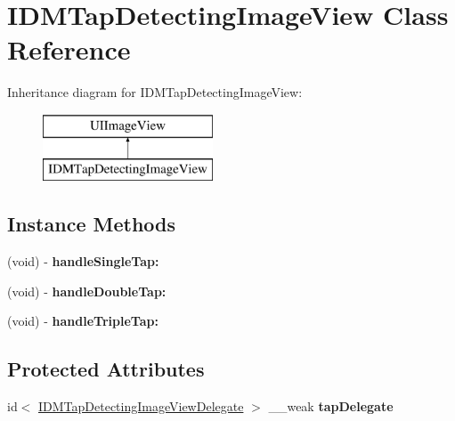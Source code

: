 \hypertarget{interface_i_d_m_tap_detecting_image_view}{}\section{I\+D\+M\+Tap\+Detecting\+Image\+View Class Reference}
\label{interface_i_d_m_tap_detecting_image_view}
Inheritance diagram for I\+D\+M\+Tap\+Detecting\+Image\+View\+:\begin{figure}[H]
\begin{center}
\leavevmode
\includegraphics[height=2.000000cm]{interface_i_d_m_tap_detecting_image_view}
\end{center}
\end{figure}
\subsection*{Instance Methods}
\begin{DoxyCompactItemize}
\item 
\hypertarget{interface_i_d_m_tap_detecting_image_view_adac6d51b2640db50081f49e0937feff8}{}(void) -\/ {\bfseries handle\+Single\+Tap\+:}\label{interface_i_d_m_tap_detecting_image_view_adac6d51b2640db50081f49e0937feff8}

\item 
\hypertarget{interface_i_d_m_tap_detecting_image_view_a954bbce654b02a4028350499b0006f5d}{}(void) -\/ {\bfseries handle\+Double\+Tap\+:}\label{interface_i_d_m_tap_detecting_image_view_a954bbce654b02a4028350499b0006f5d}

\item 
\hypertarget{interface_i_d_m_tap_detecting_image_view_a403fef805a2af6d24cfcc1657c70ad48}{}(void) -\/ {\bfseries handle\+Triple\+Tap\+:}\label{interface_i_d_m_tap_detecting_image_view_a403fef805a2af6d24cfcc1657c70ad48}

\end{DoxyCompactItemize}
\subsection*{Protected Attributes}
\begin{DoxyCompactItemize}
\item 
\hypertarget{interface_i_d_m_tap_detecting_image_view_af2335106c2b0eb426abf6b951a583a84}{}id$<$ \hyperlink{protocol_i_d_m_tap_detecting_image_view_delegate-p}{I\+D\+M\+Tap\+Detecting\+Image\+View\+Delegate} $>$ \+\_\+\+\_\+weak {\bfseries tap\+Delegate}\label{interface_i_d_m_tap_detecting_image_view_af2335106c2b0eb426abf6b951a583a84}

\end{DoxyCompactItemize}
